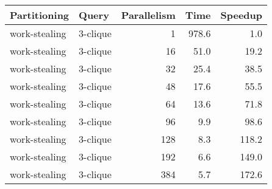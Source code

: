\begin{tabular}{llr|rr}
\toprule
  Partitioning &     Query &  Parallelism &   Time &  Speedup \\
\midrule
 work-stealing &  3-clique &            1 &  978.6 &      1.0 \\
 work-stealing &  3-clique &           16 &   51.0 &     19.2 \\
 work-stealing &  3-clique &           32 &   25.4 &     38.5 \\
 work-stealing &  3-clique &           48 &   17.6 &     55.5 \\
 work-stealing &  3-clique &           64 &   13.6 &     71.8 \\
 work-stealing &  3-clique &           96 &    9.9 &     98.6 \\
 work-stealing &  3-clique &          128 &    8.3 &    118.2 \\
 work-stealing &  3-clique &          192 &    6.6 &    149.0 \\
 work-stealing &  3-clique &          384 &    5.7 &    172.6 \\
\bottomrule
\end{tabular}
